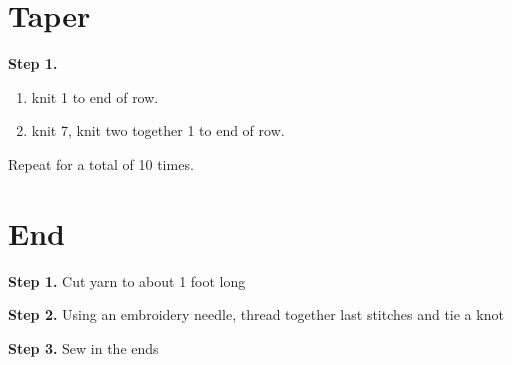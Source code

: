 \documentclass[10pt]{article}
\begin{document}
\section*{Taper}

\textbf{Step 1. }
\begin{enumerate}[label=(\alph*)]
\item knit 1 to end of row. 
\item knit 7, knit two together 1 to end of row. 
\end{enumerate}
Repeat for a total of 10 times.


\section*{End}

\textbf{Step 1. }Cut yarn to about 1 foot long

\textbf{Step 2. }Using an embroidery needle, thread together last stitches and tie a knot

\textbf{Step 3. }Sew in the ends
\end{document}
